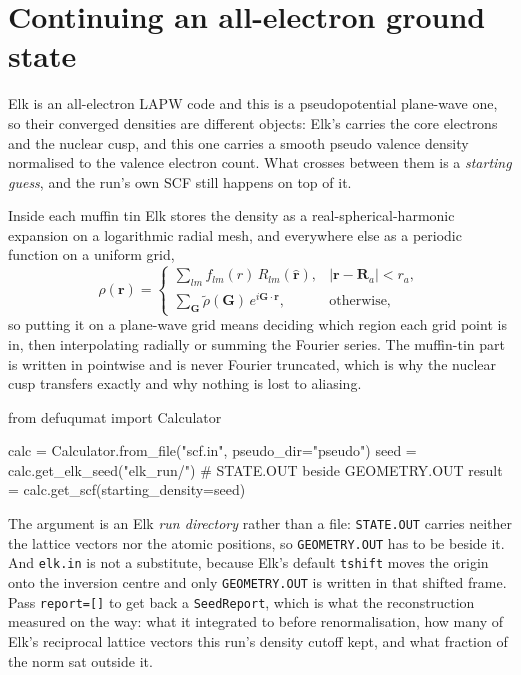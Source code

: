 \documentclass[11pt,a4paper]{article}
\newcommand{\code}[1]{\texttt{\small #1}}
\begin{document}
\section{Continuing an all-electron ground state}

Elk is an all-electron LAPW code and this is a pseudopotential plane-wave one,
so their converged densities are different objects: Elk's carries the core
electrons and the nuclear cusp, and this one carries a smooth pseudo valence
density normalised to the valence electron count. What crosses between them is a
\emph{starting guess}, and the run's own SCF still happens on top of it.

Inside each muffin tin Elk stores the density as a real-spherical-harmonic
expansion on a logarithmic radial mesh, and everywhere else as a periodic
function on a uniform grid,
\begin{equation*}
  \rho(\mathbf r) =
  \begin{cases}
    \sum_{lm} f_{lm}(r)\,R_{lm}(\hat{\mathbf r}), & |\mathbf r - \mathbf R_a| < r_a,\\[4pt]
    \sum_{\mathbf G} \tilde\rho(\mathbf G)\, e^{i\mathbf G\cdot\mathbf r}, & \text{otherwise,}
  \end{cases}
\end{equation*}
so putting it on a plane-wave grid means deciding which region each grid point
is in, then interpolating radially or summing the Fourier series. The muffin-tin
part is written in pointwise and is never Fourier truncated, which is why the
nuclear cusp transfers exactly and why nothing is lost to aliasing.

\begin{pycode}
from defuqumat import Calculator

calc = Calculator.from_file("scf.in", pseudo_dir="pseudo")
seed = calc.get_elk_seed("elk_run/")     # STATE.OUT beside GEOMETRY.OUT
result = calc.get_scf(starting_density=seed)
\end{pycode}

The argument is an Elk \emph{run directory} rather than a file:
\code{STATE.OUT} carries neither the lattice vectors nor the atomic positions,
so \code{GEOMETRY.OUT} has to be beside it. And \code{elk.in} is not a
substitute, because Elk's default \code{tshift} moves the origin onto the
inversion centre and only \code{GEOMETRY.OUT} is written in that shifted frame.
Pass \code{report=[]} to get back a \code{SeedReport}, which is what the
reconstruction measured on the way: what it integrated to before renormalisation,
how many of Elk's reciprocal lattice vectors this run's density cutoff kept, and
what fraction of the norm sat outside it.
\end{document}
